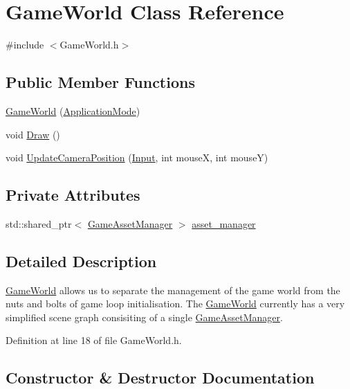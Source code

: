 \hypertarget{class_game_world}{}\section{Game\+World Class Reference}
\label{class_game_world}


{\ttfamily \#include $<$Game\+World.\+h$>$}

\subsection*{Public Member Functions}
\begin{DoxyCompactItemize}
\item 
\hyperlink{class_game_world_a17a84e57a80600961088afc753036f89}{Game\+World} (\hyperlink{common_8h_add86e7c88dd109abea3f708b422f31f0}{Application\+Mode})
\item 
void \hyperlink{class_game_world_a275418607d8286979b276f165ad5876b}{Draw} ()
\item 
void \hyperlink{class_game_world_aa934714929b8b3bcf322f1ec4695d75b}{Update\+Camera\+Position} (\hyperlink{common_8h_a080a822f0093973313bd644e517a5090}{Input}, int mouse\+X, int mouse\+Y)
\end{DoxyCompactItemize}
\subsection*{Private Attributes}
\begin{DoxyCompactItemize}
\item 
std\+::shared\+\_\+ptr$<$ \hyperlink{class_game_asset_manager}{Game\+Asset\+Manager} $>$ \hyperlink{class_game_world_aec5c0bca4fb5a41e4aac2dce2871266d}{asset\+\_\+manager}
\end{DoxyCompactItemize}


\subsection{Detailed Description}
\hyperlink{class_game_world}{Game\+World} allows us to separate the management of the game world from the nuts and bolts of game loop initialisation. The \hyperlink{class_game_world}{Game\+World} currently has a very simplified scene graph consisiting of a single \hyperlink{class_game_asset_manager}{Game\+Asset\+Manager}. 

Definition at line 18 of file Game\+World.\+h.



\subsection{Constructor \& Destructor Documentation}
\hypertarget{class_game_world_a17a84e57a80600961088afc753036f89}{}
